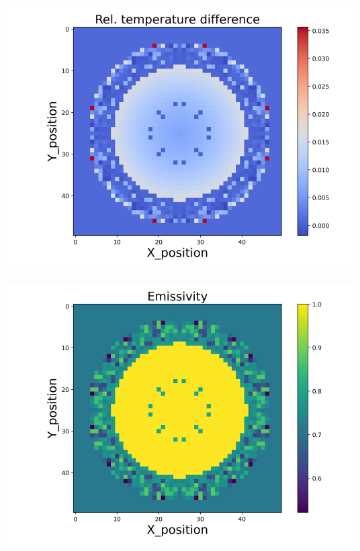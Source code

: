 \begin{figure}[htbp]
    \centering
    \begin{minipage}{\textwidth}
        \centering
        \begin{subfigure}{0.49\textwidth}
            \centering
            \includegraphics[width=\textwidth]{figures/raw_data/0/mix/T_bias.jpg}
        \end{subfigure}
        \begin{subfigure}{0.49\textwidth}
            \centering
            \includegraphics[width=\textwidth]{figures/raw_data/0/mix/emi_cal.jpg}
        \end{subfigure}
    \end{minipage}\\

\end{figure}
